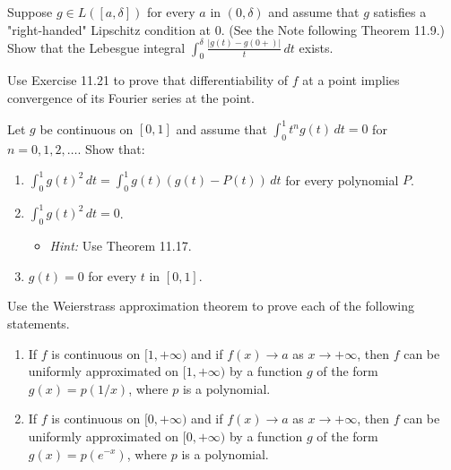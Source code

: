 \begin{problembox}
Suppose $g \in L([a, \delta])$ for every $a$ in $(0, \delta)$ and assume that $g$ satisfies a "right-handed" Lipschitz condition at 0. (See the Note following Theorem 11.9.) Show that the Lebesgue integral $\int_0^\delta \frac{|g(t) - g(0+)|}{t} \, dt$ exists.
\end{problembox}

\begin{problembox}
Use Exercise 11.21 to prove that differentiability of $f$ at a point implies convergence of its Fourier series at the point.
\end{problembox}

\begin{problembox}
Let $g$ be continuous on $[0, 1]$ and assume that $\int_0^1 t^n g(t) \, dt = 0$ for $n = 0, 1, 2, \dots$. Show that:
\begin{enumerate}[label=(\alph*)]
\item $\int_0^1 g(t)^2 \, dt = \int_0^1 g(t)(g(t) - P(t)) \, dt$ for every polynomial $P$.
\item $\int_0^1 g(t)^2 \, dt = 0$.
\begin{itemize}
\item \textit{Hint:} Use Theorem 11.17.
\end{itemize}
\item $g(t) = 0$ for every $t$ in $[0, 1]$.
\end{enumerate}
\end{problembox}

\begin{problembox}
Use the Weierstrass approximation theorem to prove each of the following statements.
\begin{enumerate}[label=(\alph*)]
\item If $f$ is continuous on $[1, +\infty)$ and if $f(x) \to a$ as $x \to +\infty$, then $f$ can be uniformly approximated on $[1, +\infty)$ by a function $g$ of the form $g(x) = p(1/x)$, where $p$ is a polynomial.
\item If $f$ is continuous on $[0, +\infty)$ and if $f(x) \to a$ as $x \to +\infty$, then $f$ can be uniformly approximated on $[0, +\infty)$ by a function $g$ of the form $g(x) = p(e^{-x})$, where $p$ is a polynomial.
\end{enumerate}
\end{problembox}

